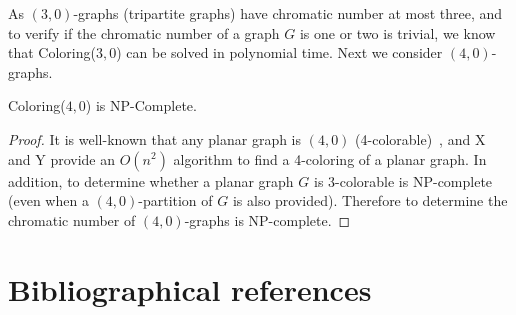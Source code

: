 \documentclass[9pt]{./document-types/entcs} \usepackage{./document-types/entcsmacro}
\begin{document}
As $(3,0)$-graphs (tripartite graphs) have chromatic number at most three, and to verify if the chromatic number of a graph $G$
is one or two is trivial, we know that {\sc Coloring($3,0$)} can be solved in polynomial time.
Next we consider $(4,0)$-graphs.

\begin{lemma}
{\sc Coloring($4,0$)} is NP-Complete.
\end{lemma}
\begin{proof}
It is well-known that any planar graph is $(4,0)$ (4-colorable)~\cite{appel77}, and X and Y provide an $O(n^2)$ algorithm to find a 4-coloring of a planar graph.
In addition, to determine whether a planar graph $G$ is 3-colorable is NP-complete~\cite{larry} (even when a $(4,0)$-partition of $G$ is also provided).
Therefore to determine the chromatic number of $(4,0)$-graphs is NP-complete.
\end{proof}



\section{Bibliographical references}\label{references}

\begin{thebibliography}{10}\label{bibliography}

\end{thebibliography}
\end{document}
